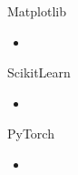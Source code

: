 \begin{dwHeaderFrame}{Matplotlib}
	\begin{itemize}
		\item
	\end{itemize}
\end{dwHeaderFrame}


\begin{dwHeaderFrame}{ScikitLearn}
	\begin{itemize}
		\item
	\end{itemize}
\end{dwHeaderFrame}


\begin{dwHeaderFrame}{PyTorch}
	\begin{itemize}
		\item
	\end{itemize}
\end{dwHeaderFrame}


\makethanks


